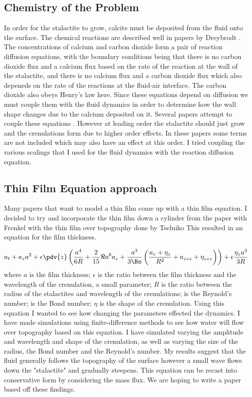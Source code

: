 \documentclass[12pt]{article}
\begin{document}
\subsection{Chemistry of the Problem}
In order for the stalactite to grow, calcite must be deposited from the fluid onto the surface. The chemical reactions are described well in papers by Dreybrodt \cite{formation}. The concentrations of calcium and carbon dioxide form a pair of  reaction diffusion equations, with the boundary conditions being that there is no carbon dioxide flux and a calcium flux based on the rate of the reaction at the wall of the stalactite, and there is no calcium flux and a carbon dioxide flux which also depeneds on the rate of the reactions at the fluid-air interface.  The carbon dioxide also obeys Henry's law here. Since these equations depend on diffusion we must couple them with the fluid dynamics in order to determine how the wall shape changes due to the calcium deposited on it.
Several papers attempt to couple these equations \cite{short,camporeale_2017}. However at leading order the stalactite should just grow and the crenulations form due to higher order effects. In these papers some terms are not included which may also have an effect at this order. I tried coupling the various scalings that I used for the fluid dynamics with the reaction diffusion equation.




\subsection{Thin Film Equation approach}
Many papers that want to model a thin film come up with a thin film equation. I decided to try and incorporate the thin film down a cylinder from the paper with Frenkel \cite{Frenkel_1992} with the thin film over topography done by Tseluiko \cite{tseluiko_blyth_papageorgiou_2013}
This resulted in an equation for the film thickness.

\begin{align}
a_t + a_z a^2  +\epsilon\pdv{z}\left(\frac{a^4}{6R}+\frac{2}{15}\Re a^6a_z+ \frac{a^3}{3\Bo}\left(\frac{a_z+\eta_z}{R^2}+a_{zzz}+\eta_{zzz}\right)\right) + \epsilon\frac{\eta_z a^3}{3R}\label{walldyn}
\end{align}
where $a$ is the film thickness; $\epsilon$ is the ratio between the film thickness and the wavelength of the crenulation, a small parameter; $R$ is the ratio between the radius of the stalactites and wavelength of the crenulations; is the Reynold's number;  is the Bond number; $\eta$ is the shape of the crenulation.
Using this equation I wanted to see how changing the parameters effected the dynamics. I have made simulations using finite-difference methods to see how water will flow over topography based on this equation. I have simulated varying the amplitude and wavelength and shape of the crenulation, as well as varying the size of the radius, the Bond number and the Reynold's number. My results suggest that the fluid generally follows the topography of the surface however a small wave flows down the "stalactite" and gradually steepens. This equation can be recast into conservative form by considering the mass flux. We are hoping to write a paper based off these findings.
\end{document}

